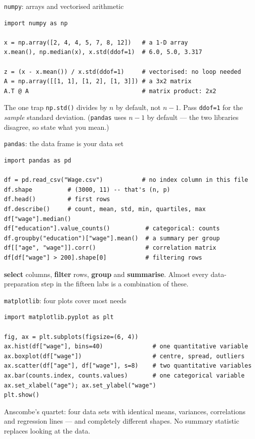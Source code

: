 \documentclass[aspectratio=169,11pt]{beamer}
\begin{document}
\begin{frame}[fragile]{\texttt{numpy}: arrays and vectorised arithmetic}
\begin{lstlisting}
import numpy as np

x = np.array([2, 4, 4, 5, 7, 8, 12])   # a 1-D array
x.mean(), np.median(x), x.std(ddof=1)  # 6.0, 5.0, 3.317

z = (x - x.mean()) / x.std(ddof=1)     # vectorised: no loop needed
A = np.array([[1, 1], [1, 2], [1, 3]]) # a 3x2 matrix
A.T @ A                                # matrix product: 2x2
\end{lstlisting}
  \begin{alertblock}{The one trap}
    \texttt{np.std()} divides by $n$ by default, not $n-1$. Pass
    \texttt{ddof=1} for the \emph{sample} standard deviation. (\texttt{pandas}
    uses $n-1$ by default --- the two libraries disagree, so state what you
    mean.)
  \end{alertblock}
\end{frame}

\begin{frame}[fragile]{\texttt{pandas}: the data frame is your data set}
\begin{lstlisting}
import pandas as pd

df = pd.read_csv("Wage.csv")           # no index column in this file
df.shape          # (3000, 11) -- that's (n, p)
df.head()         # first rows
df.describe()     # count, mean, std, min, quartiles, max
df["wage"].median()
df["education"].value_counts()          # categorical: counts
df.groupby("education")["wage"].mean()  # a summary per group
df[["age", "wage"]].corr()              # correlation matrix
df[df["wage"] > 200].shape[0]           # filtering rows
\end{lstlisting}
  \begin{takeaway}
    \textbf{select} columns, \textbf{filter} rows, \textbf{group} and
    \textbf{summarise}. Almost every data-preparation step in the fifteen
    labs is a combination of these.
  \end{takeaway}
\end{frame}

\begin{frame}[fragile]{\texttt{matplotlib}: four plots cover most needs}
\begin{lstlisting}
import matplotlib.pyplot as plt

fig, ax = plt.subplots(figsize=(6, 4))
ax.hist(df["wage"], bins=40)              # one quantitative variable
ax.boxplot(df["wage"])                    # centre, spread, outliers
ax.scatter(df["age"], df["wage"], s=8)    # two quantitative variables
ax.bar(counts.index, counts.values)       # one categorical variable
ax.set_xlabel("age"); ax.set_ylabel("wage")
plt.show()
\end{lstlisting}
  \begin{takeaway}
    Anscombe's quartet: four data sets with identical means, variances,
    correlations and regression lines --- and completely different shapes.
    No summary statistic replaces looking at the data.
  \end{takeaway}
\end{frame}
\end{document}
